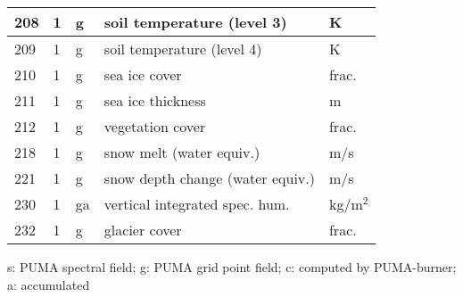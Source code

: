 \documentclass[a4paper,12pt]{article}
\begin{document}
\begin{table}[t]
\begin{tabular}[t]{|l|l|l|l|l|}
208 & 1    & g  & soil temperature (level 3)       & K               \\ \hline
209 & 1    & g  & soil temperature (level 4)       & K               \\ \hline
210 & 1    & g  & sea ice cover                    & frac.           \\ \hline
211 & 1    & g  & sea ice thickness                & m               \\ \hline
212 & 1    & g  & vegetation cover                 & frac.           \\ \hline
218 & 1    & g  & snow melt (water equiv.)         & m/s             \\ \hline
221 & 1    & g  & snow depth change (water equiv.) & m/s             \\ \hline
230 & 1    & ga & vertical integrated spec. hum.   & kg/m$^{2}$      \\ \hline
232 & 1    & g  & glacier cover                    & frac.           \\ \hline

\end{tabular}

\vspace*{0.5cm}

s: PUMA spectral field; g: PUMA grid point field; c: computed by PUMA-burner;
a: accumulated

\end{table}
\end{document}
